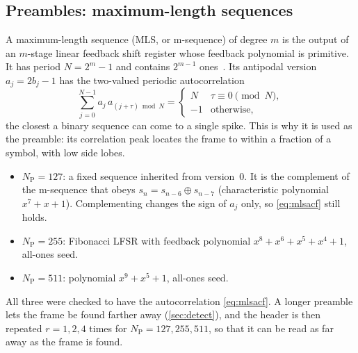 \documentclass[11pt,a4paper]{article}
\newcommand{\NP}{N_{\mathrm{P}}}
\theoremstyle{remark}
\begin{document}
\subsection{Preambles: maximum-length sequences}
\label{sec:mls}
A maximum-length sequence (MLS, or m-sequence) of degree $m$ is the output of an $m$-stage linear feedback shift register whose feedback polynomial is primitive. It has period $N = 2^m - 1$ and contains $2^{m-1}$ ones~\cite{golomb}. Its antipodal version $a_j = 2b_j - 1$ has the two-valued periodic autocorrelation
\begin{equation}
\sum_{j=0}^{N-1} a_j\, a_{(j+\tau) \bmod N} = \begin{cases} N & \tau \equiv 0 \pmod N,\\ -1 & \text{otherwise,}\end{cases}
\label{eq:mlsacf}
\end{equation}
the closest a binary sequence can come to a single spike. This is why it is used as the preamble: its correlation peak locates the frame to within a fraction of a symbol, with low side lobes.
\begin{itemize}
\item $\NP = 127$: a fixed sequence inherited from version~0. It is the complement of the m-sequence that obeys $s_n = s_{n-6} \oplus s_{n-7}$ (characteristic polynomial $x^7 + x + 1$). Complementing changes the sign of $a_j$ only, so \cref{eq:mlsacf} still holds.
\item $\NP = 255$: Fibonacci LFSR with feedback polynomial $x^8 + x^6 + x^5 + x^4 + 1$, all-ones seed.
\item $\NP = 511$: polynomial $x^9 + x^5 + 1$, all-ones seed.
\end{itemize}
All three were checked to have the autocorrelation \cref{eq:mlsacf}. A longer preamble lets the frame be found farther away (\cref{sec:detect}), and the header is then repeated $r = 1, 2, 4$ times for $\NP = 127, 255, 511$, so that it can be read as far away as the frame is found.
\end{document}
